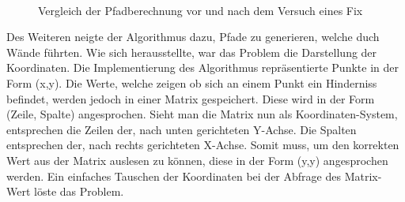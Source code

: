 \begin{enumerate}[leftmargin=*]
    \begin{figure}[H]
        \centering
        \\
        \caption{Vergleich der Pfadberechnung vor und nach dem Versuch eines Fix}
    \end{figure}

    Des Weiteren neigte der Algorithmus dazu, Pfade zu generieren, welche duch Wände führten.
    Wie sich herausstellte, war das Problem die Darstellung der Koordinaten.
    Die Implementierung des Algorithmus repräsentierte Punkte in der Form (x,y).
    Die Werte, welche zeigen ob sich an einem Punkt ein Hinderniss befindet, werden jedoch in einer Matrix gespeichert.
    Diese wird in der Form (Zeile, Spalte) angesprochen.
    Sieht man die Matrix nun als Koordinaten-System, entsprechen die Zeilen der, nach unten gerichteten Y-Achse.
    Die Spalten entsprechen der, nach rechts gerichteten X-Achse.
    Somit muss, um den korrekten Wert aus der Matrix auslesen zu können, diese in der Form (y,y) angesprochen werden.
    Ein einfaches Tauschen der Koordinaten bei der Abfrage des Matrix-Wert löste das Problem.
\end{enumerate}

